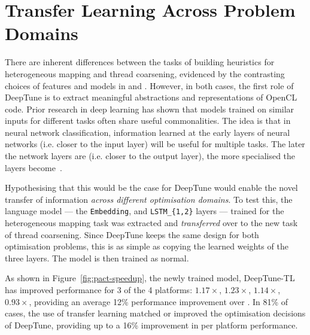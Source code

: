 \section{Transfer Learning Across Problem Domains}
\label{sec:deeptune-transfer-learning}

There are inherent differences between the tasks of building heuristics for heterogeneous mapping and thread coarsening, evidenced by the contrasting choices of features and models in \citeauthor{Grewe2013} and \citeauthor{Magni2014}. However, in both cases, the first role of DeepTune is to extract meaningful abstractions and representations of OpenCL code. Prior research in deep learning has shown that models trained on similar inputs for different tasks often share useful commonalities. The idea is that in neural network classification, information learned at the early layers of neural networks (i.e. closer to the input layer) will be useful for multiple tasks. The later the network layers are (i.e. closer to the output layer), the more specialised the layers become~\cite{Zeiler2014}.

Hypothesising that this would be the case for DeepTune would enable the novel transfer of information \emph{across different optimisation domains}. To test this, the language model --- the \texttt{Embedding}, and \texttt{LSTM\_\{1,2\}} layers --- trained for the heterogeneous mapping task was extracted and \emph{transferred} over to the new task of thread coarsening. Since DeepTune keeps the same design for both optimisation problems, this is as simple as copying the learned weights of the three layers. The model is then trained as normal.

As shown in Figure~\ref{fig:pact-speedup}, the newly trained model, DeepTune-TL has improved performance for 3 of the 4 platforms: $1.17\times$, $1.23\times$, $1.14\times$, $0.93\times$, providing an average 12\% performance improvement over \citeauthor{Magni2014}. In 81\% of cases, the use of transfer learning matched or improved the optimisation decisions of DeepTune, providing up to a 16\% improvement in per platform performance.

